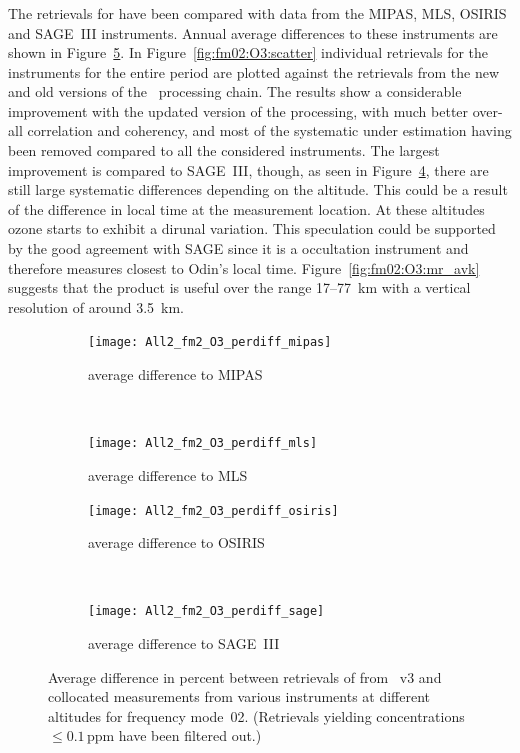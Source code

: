\subsubsection{}
\label{sec:fm02:comparison:O3}
The retrievals for  have been compared with data from the MIPAS, MLS,
OSIRIS and SAGE~III instruments. Annual average differences to these
instruments are shown in Figure~\ref{fig:fm02:O3:profiles}. In
Figure~\ref{fig:fm02:O3:scatter} individual retrievals for the instruments for
the entire period are plotted against the retrievals from the new and old
versions of the \smr\ processing chain. The results show a considerable
improvement with the updated version of the processing, with much better
over-all correlation and coherency, and most of the systematic under
estimation having been removed compared to all the considered instruments. The
largest improvement is compared to SAGE~III, though, as seen in
Figure~\ref{fig:fm02:O3:profiles:SAGEIII}, there are still large systematic
differences depending on the altitude. This could be a result of the difference
in local time at the measurement location. At these altitudes ozone starts to
exhibit a dirunal variation. This speculation could be supported by the good
agreement with SAGE since it is a occultation instrument and therefore measures
closest to Odin's local time.  Figure~\ref{fig:fm02:O3:mr_avk} suggests that
the product is useful over the range 17--77~km with a vertical resolution of
around 3.5~km.


\begin{figure}[tbhp]
    \centering
    \begin{subfigure}[b]{0.49\textwidth}
        \texttt{[image: All2\_fm2\_O3\_perdiff\_mipas]}
        \caption{average difference to MIPAS}
        \label{fig:fm02:O3:profiles:MIPAS}
    \end{subfigure}
    \,
    \begin{subfigure}[b]{0.49\textwidth}
        \texttt{[image: All2\_fm2\_O3\_perdiff\_mls]}
        \caption{average difference to MLS}
        \label{fig:fm02:O3:profiles:MLS}
    \end{subfigure}

    \begin{subfigure}[b]{0.49\textwidth}
        \texttt{[image: All2\_fm2\_O3\_perdiff\_osiris]}
        \caption{average difference to OSIRIS}
        \label{fig:fm02:O3:profiles:OSIRIS}
    \end{subfigure}
    \,
    \begin{subfigure}[b]{0.49\textwidth}
        \texttt{[image: All2\_fm2\_O3\_perdiff\_sage]}
        \caption{average difference to SAGE~III}
        \label{fig:fm02:O3:profiles:SAGEIII}
    \end{subfigure}
    \caption{Average difference in percent between retrievals of 
    from \smr~v3 and collocated measurements from various instruments at
    different altitudes for frequency mode~02. (Retrievals yielding
    concentrations $\leq 0.1\,\mathrm{ppm}$ have been filtered out.)}

    \label{fig:fm02:O3:profiles}
\end{figure}

